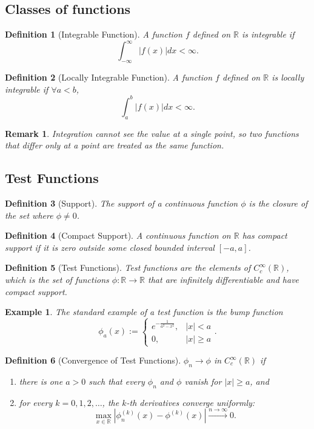 \documentclass{article}
\newtheorem{definition}{Definition}
\newtheorem*{example}{Example}
\newtheorem{remark}{Remark}
\newcommand{\R}{\mathbb{R}}
\newcommand{\intinf}{\int_{-\infty}^{\infty}}
\begin{document}
\subsection{Classes of functions}
\begin{definition}[Integrable Function]
    A function $f$ defined on $\R$ is integrable if
    \[\intinf|f(x)|dx < \infty.\]
\end{definition}
\begin{definition}[Locally Integrable Function]
    A function $f$ defined on $\R$ is locally integrable if $\forall a<b$,
    \[\int_{a}^{b}|f(x)|dx < \infty.\]    
\end{definition}
\begin{remark}
    Integration cannot see the value at a single point, so two functions that differ only at a point are treated as the same function.
\end{remark}

\subsection{Test Functions}
\begin{definition}[Support]
    The support of a continuous function $\phi$ is the closure of the set where $\phi \neq 0$.
\end{definition}
\begin{definition}[Compact Support]
    A continuous function on $\R$ has compact support if it is zero outside some closed bounded interval $[-a,a]$.
\end{definition}
\begin{definition}[Test Functions]
    Test functions are the elements of $C_c^{\infty}(\R)$, which is the set of functions $\phi: \R \to \R$ that are infinitely differentiable and have compact support.
\end{definition}
\begin{example}
    The standard example of a test function is the bump function
    \begin{equation}
        \label{eq:bump}
        \phi_a(x) := \begin{cases}e^{-\frac{1}{a^2-x^2}}, & |x|<a\\0, & |x|\geq a\end{cases}.
    \end{equation}
\end{example}
\begin{definition}[Convergence of Test Functions]
    $\phi_n \to \phi$ in $C^{\infty}_c(\R)$ if
    \begin{enumerate}[label=(\roman*)]
        \item there is one $a>0$ such that every $\phi_n$ and $\phi$ vanish for $|x|\geq a$, and
        \item for every $k=0,1,2,\dots$, the $k$-th derivatives converge uniformly:
        \[\max_{x\in\R}\left|\phi_n^{(k)}(x)-\phi^{(k)}(x)\right| \xrightarrow{n\to\infty} 0.\]
    \end{enumerate}
\end{definition}
\end{document}
